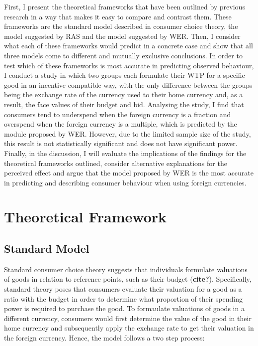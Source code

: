 \documentclass[
]{report}
\begin{document}
First, I present the theoretical frameworks that have been outlined by
previous research in a way that makes it easy to compare and contrast
them. These frameworks are the standard model described in consumer
choice theory, the model suggested by RAS and the model suggested by
WER. Then, I consider what each of these frameworks would predict in a
concrete case and show that all three models come to different and
mutually exclusive conclusions. In order to test which of these
frameworks is most accurate in predicting observed behaviour, I conduct
a study in which two groups each formulate their WTP for a specific good
in an incentive compatible way, with the only difference between the
groups being the exchange rate of the currency used to their home
currency and, as a result, the face values of their budget and bid.
Analysing the study, I find that consumers tend to underspend when the
foreign currency is a fraction and overspend when the foreign currency
is a multiple, which is predicted by the module proposed by WER.
However, due to the limited sample size of the study, this result is not
statistically significant and does not have significant power. Finally,
in the discussion, I will evaluate the implications of the findings for
the theoretical frameworks outlined, consider alternative explanations
for the perceived effect and argue that the model proposed by WER is the
most accurate in predicting and describing consumer behaviour when using
foreign currencies.

\chapter{Theoretical Framework}\label{theoretical-framework}

\section{Standard Model}\label{standard-model}

Standard consumer choice theory suggests that individuals formulate
valuations of goods in relation to reference points, such as their
budget (\textbf{cite?}). Specifically, standard theory poses that
consumers evaluate their valuation for a good as a ratio with the budget
in order to determine what proportion of their spending power is
required to purchase the good. To formaulate valuations of goods in a
different currency, consumers would first determine the value of the
good in their home currency and subsequently apply the exchange rate to
get their valuation in the foreign currency. Hence, the model follows a
two step process:
\end{document}
